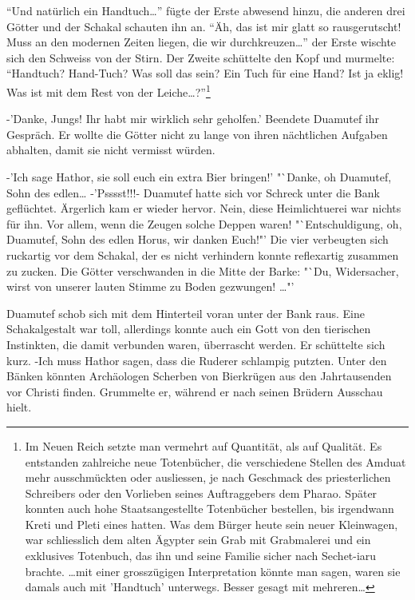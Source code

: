 \documentclass[11pt,titlepage,a5paper]{book}
\begin{document}
"`Und natürlich ein Handtuch\dots"' fügte der Erste abwesend hinzu, die anderen drei Götter und der Schakal schauten ihn an. "`Äh, das ist mir glatt so rausgerutscht! Muss an den modernen Zeiten liegen, die wir durchkreuzen\dots"' der Erste wischte sich den Schweiss von der Stirn. Der Zweite schüttelte den Kopf und  murmelte: "`Handtuch? Hand-Tuch? Was soll das sein? Ein Tuch für eine Hand? Ist ja eklig! Was ist mit dem Rest von der Leiche\dots?"'\footnote{Im Neuen Reich setzte man vermehrt auf Quantität, als auf Qualität. Es entstanden zahlreiche neue Totenbücher, die verschiedene Stellen des Amduat mehr ausschmückten oder ausliessen, je nach Geschmack des priesterlichen Schreibers oder den Vorlieben seines Auftraggebers dem Pharao. Später konnten auch hohe Staatsangestellte Totenbücher bestellen, bis irgendwann Kreti und Pleti eines hatten. Was dem Bürger heute sein neuer Kleinwagen, war schliesslich dem alten Ägypter sein Grab mit Grabmalerei und ein exklusives Totenbuch, das ihn und seine Familie sicher nach Sechet-iaru brachte. \dots mit einer grosszügigen Interpretation könnte man sagen, waren sie damals auch mit 'Handtuch' unterwegs. Besser gesagt mit mehreren\dots}

-'Danke, Jungs! Ihr habt mir wirklich sehr geholfen.' Beendete Duamutef ihr Gespräch. Er wollte die Götter nicht zu lange von ihren nächtlichen Aufgaben abhalten, damit sie nicht vermisst würden.

-'Ich sage Hathor, sie soll euch ein extra Bier bringen!' "`{\Large Danke, oh Duamutef, Sohn des edlen\dots} -'Psssst!!!- Duamutef hatte sich vor Schreck unter die Bank geflüchtet. Ärgerlich kam er wieder hervor. Nein, diese Heimlichtuerei war nichts für ihn. Vor allem, wenn die Zeugen solche Deppen waren! "`{\scriptsize Entschuldigung, oh, Duamutef, Sohn des edlen Horus, wir danken Euch!"'} Die vier verbeugten sich ruckartig vor dem Schakal, der es nicht verhindern konnte reflexartig zusammen zu zucken. Die Götter verschwanden in die Mitte der Barke: "`{\LARGE Du, Widersacher, wirst von unserer lauten Stimme zu Boden gezwungen! \dots"'}

Duamutef schob sich mit dem Hinterteil voran unter der Bank raus. Eine Schakalgestalt war toll, allerdings konnte auch ein Gott von den tierischen Instinkten, die damit verbunden waren, überrascht werden. Er schüttelte sich kurz. -Ich muss Hathor sagen, dass die Ruderer schlampig putzten. Unter den Bänken könnten Archäologen Scherben von Bierkrügen aus den Jahrtausenden vor Christi finden. Grummelte er, während er nach seinen Brüdern Ausschau hielt.
\end{document}
